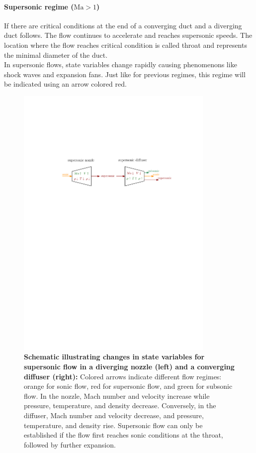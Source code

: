 	\paragraph{Supersonic regime ($\mathrm{Ma} > 1$)}
		If there are critical conditions at the end of a converging duct and a diverging duct follows.
		The flow continues to accelerate and reaches supersonic speeds.
		The location where the flow reaches critical condition is called throat and represents the minimal diameter of the duct.\\
		In supersonic flows, state variables change rapidly causing phenomenons like shock waves and expansion fans.
		Just like for previous regimes, this regime will be indicated using an arrow colored red.
		\cite{Cantwell_AA210A}
		\begin{figure}[H]
		    \centering
		    \includegraphics[width=0.85\textwidth]{src/02_foundations/fig_variable-change-supersonic.pdf}
			\caption[Schematic illustrating changes in state variables for supersonic flow in a diverging nozzle (left) and a converging diffuser (right).]{
				\textbf{Schematic illustrating changes in state variables for supersonic flow in a diverging nozzle (left) and a converging diffuser (right):}
				Colored arrows indicate different flow regimes: orange for sonic flow, red for supersonic flow, and green for subsonic flow.
				In the nozzle, Mach number and velocity increase while pressure, temperature, and density decrease.
				Conversely, in the diffuser, Mach number and velocity decrease, and pressure, temperature, and density rise.
				Supersonic flow can only be established if the flow first reaches sonic conditions at the throat, followed by further expansion.
				\cite{Cengel2017}
			}
		\end{figure}

